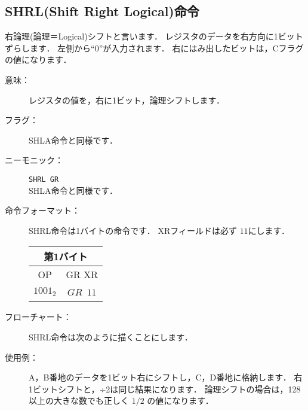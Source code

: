 \newpage
\subsection{SHRL{\small (Shift Right Logical)}命令}
右論理(論理＝Logical)シフトと言います．
レジスタのデータを右方向に1ビットずらします．
左側から``0''が入力されます．
右にはみ出したビットは，Cフラグの値になります．

\begin{center}
\epsfxsize=5cm
\end{center}

\begin{description}
\item[意味：]レジスタの値を，右に1ビット，論理シフトします．

\item[フラグ：]
SHLA命令と同様です．

\item[ニーモニック：]{\tt SHRL  GR} \\
SHLA命令と同様です．

\item[命令フォーマット：]SHRL命令は1バイトの命令です．
XRフィールドは必ず $11$にします．

\begin{tabular}{|c|c|} \hline
\multicolumn{2}{|c|}{第1バイト} \\
\hline
OP & GR XR \\
\hline
$1001_2$ & $GR$~$11$ \\
\hline
\end{tabular}

\item[フローチャート：]SHRL命令は次のように描くことにします．

\begin{flushleft}
\epsfxsize=3cm
\end{flushleft}

\item[使用例：]
A，B番地のデータを1ビット右にシフトし，C，D番地に格納します．
右1ビットシフトと，÷2は同じ結果になります．
論理シフトの場合は，128以上の大きな数でも正しく $1/2$ の値になります．


\end{description}
